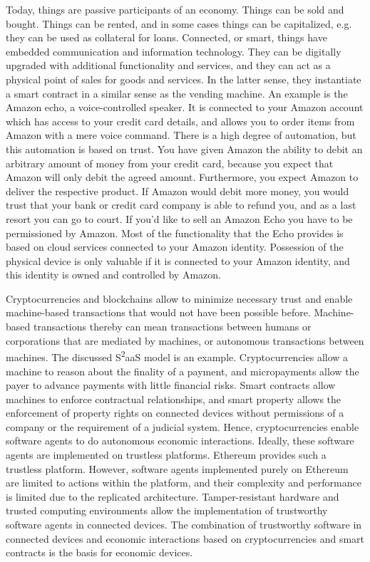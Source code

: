 Today, things are passive participants of an economy. Things can be sold and bought. Things can be rented, and in some cases things can be capitalized, e.g. they can be used as collateral for loans. Connected, or smart, things have embedded communication and information technology. They can be digitally upgraded with additional functionality and services, and they can act as a physical point of sales for goods and services. In the latter sense, they instantiate a smart contract in a similar sense as the vending machine. An example is the Amazon echo, a voice-controlled speaker. It is connected to your Amazon account which has access to your credit card details, and allows you to order items from Amazon with a mere voice command. There is a high degree of automation, but this automation is based on trust. You have given Amazon the ability to debit an arbitrary amount of money from your credit card, because you expect that Amazon will only debit the agreed amount. Furthermore, you expect Amazon to deliver the respective product. If Amazon would debit more money, you would trust that your bank or credit card company is able to refund you, and as a last resort you can go to court. If you'd like to sell an Amazon Echo you have to be permissioned by Amazon. Most of the functionality that the Echo provides is based on cloud services connected to your Amazon identity. Possession of the physical device is only valuable if it is connected to your Amazon identity, and this identity is owned and controlled by Amazon.

Cryptocurrencies and blockchains allow to minimize necessary trust and enable machine-based transactions that would not have been possible before. 
Machine-based transactions thereby can mean transactions between humans or corporations that are mediated by machines, or autonomous transactions between machines. The discussed S\textsuperscript{2}aaS model is an example. Cryptocurrencies allow a machine to reason about the finality of a payment, and micropayments allow the payer to advance payments with little financial risks. Smart contracts allow machines to enforce contractual relationships, and smart property allows the enforcement of property rights on connected devices without permissions of a company or the requirement of a judicial system. 
Hence, cryptocurrencies enable software agents to do autonomous economic interactions. Ideally, these software agents are implemented on trustless platforms. Ethereum provides such a trustless platform. However, software agents implemented purely on Ethereum are limited to actions within the platform, and their complexity and performance is limited due to the replicated architecture. Tamper-resistant hardware and trusted computing environments allow the implementation of trustworthy software agents in connected devices. The combination of trustworthy software in connected devices and economic interactions based on cryptocurrencies and smart contracts is the basis for economic devices.

